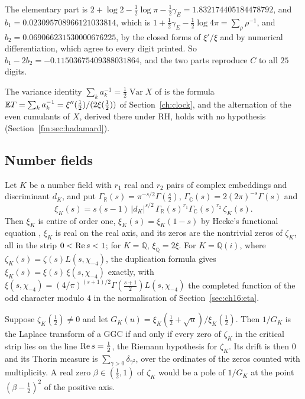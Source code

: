 The elementary part is $2+\log2-\frac12\log\pi-\frac12\gamma_E=1.832174405184478792$, and $b_1=0.023095708966121033814$, which is $1+\frac12\gamma_E-\frac12\log4\pi=\sum_\rho\rho^{-1}$, and $b_2=0.069066231530000676225$, by the closed forms of $\xi'/\xi$ and by numerical differentiation, which agree to every digit printed. So $b_1-2b_2=-0.11503675409388031864$, and the two parts reproduce $C$ to all $25$ digits.

The variance identity $\sum_ka_k^{-1}=\frac12\operatorname{Var}X$ of \cite{P26sqf} is the formula $\mathbb{E} T=\sum_ka_k^{-1}=\xi''(\frac12)/(2\xi(\frac12))$ of Section~\ref{ch:clock}, and the alternation of the even cumulants of $X$, derived there under RH, holds with no hypothesis (Section~\ref{fm:sec:hadamard}).

\subsection{Number fields}\label{sec:sqfree:nf}

Let $K$ be a number field with $r_1$ real and $r_2$ pairs of complex embeddings and discriminant $d_K$, and put $\Gamma_{\mathbb R}(s)=\pi^{-s/2}\Gamma(\frac s2)$, $\Gamma_{\mathbb C}(s)=2(2\pi)^{-s}\Gamma(s)$ and
\[
\xi_K(s)=s(s-1)\,|d_K|^{s/2}\,\Gamma_{\mathbb R}(s)^{r_1}\Gamma_{\mathbb C}(s)^{r_2}\,\zeta_K(s).
\]
Then $\xi_K$ is entire of order one, $\xi_K(s)=\xi_K(1-s)$ by Hecke's functional equation \cite[Chapter~XIII]{Lang94}, $\xi_K$ is real on the real axis, and its zeros are the nontrivial zeros of $\zeta_K$, all in the strip $0<\operatorname{Re} s<1$; for $K=\mathbb Q$, $\xi_{\mathbb Q}=2\xi$. For $K=\mathbb Q(i)$, where $\zeta_K(s)=\zeta(s)L(s,\chi_{-4})$, the duplication formula gives $\xi_K(s)=\xi(s)\,\xi(s,\chi_{-4})$ exactly, with $\xi(s,\chi_{-4})=(4/\pi)^{(s+1)/2}\Gamma(\frac{s+1}2)L(s,\chi_{-4})$ the completed function of the odd character modulo $4$ in the normalisation of Section~\ref{sec:ch16:eta}.

\begin{proposition}\label{prop:sqfree:thorinK}
Suppose $\zeta_K(\frac12)\ne0$ and let $G_K(u)=\xi_K(\frac12+\sqrt u)/\xi_K(\frac12)$. Then $1/G_K$ is the Laplace transform of a GGC if and only if every zero of $\zeta_K$ in the critical strip lies on the line $\operatorname{Re} s=\frac12$, the Riemann hypothesis for $\zeta_K$. Its drift is then $0$ and its Thorin measure is $\sum_{\gamma>0}\delta_{\gamma^2}$, over the ordinates of the zeros counted with multiplicity. A real zero $\beta\in(\frac12,1)$ of $\zeta_K$ would be a pole of $1/G_K$ at the point $(\beta-\frac12)^2$ of the positive axis.
\end{proposition}

